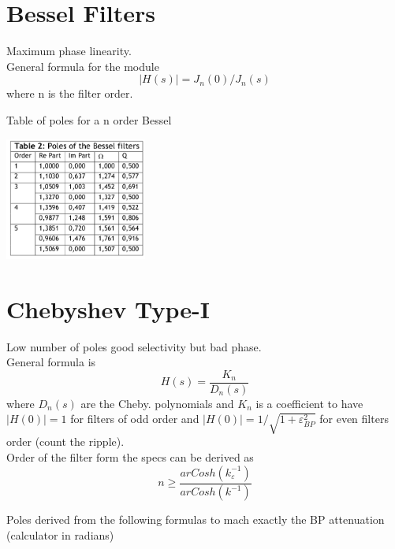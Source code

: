 \section{Bessel Filters}

Maximum phase linearity.\\
General formula for the module 
\begin{equation}
|H(s)|=J_n(0)/J_n(s)
\end{equation}
where n is the filter order.

Table of poles for a n order Bessel 

\centering
\includegraphics[width=0.35\textwidth]{bessel.png}\\
\raggedright



\section{Chebyshev Type-I}
Low number of poles good selectivity but bad phase.\\
General formula is
\begin{equation}
H(s)=\frac{K_n}{D_n(s)}
\end{equation}
where $D_n(s)$ are the Cheby. polynomials and $K_n$ is a coefficient to have $|H(0)|=1$ for filters of odd order and $|H(0)|=1/\sqrt{1+\varepsilon_{BP}^2}$ for even filters order (count the ripple).\\
\vspace{2mm}
Order of the filter form the specs can be derived as
\begin{equation}
n\ge \frac{arCosh(k_{\varepsilon}^{-1})}{arCosh(k^{-1})}
\end{equation} 

Poles derived from the following formulas to mach exactly the BP attenuation (calculator in radians)

